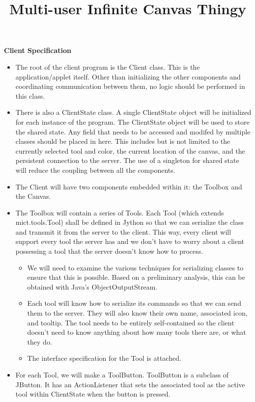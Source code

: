 \documentclass[12pt]{article}
\title{Multi-user Infinite Canvas Thingy}
\begin{document}
 \maketitle
 \textbf{Client Specification}
 \begin{itemize}
 \item
    The root of the client program is the Client class. This is the application/applet itself. Other than initializing the other components and coordinating communication between them, no logic should be performed in this class.
 \item
     There is also a ClientState class. A single ClientState object will be initialized for each instance of the program. The ClientState object will be used to store the shared state. Any field that needs to be accessed and modifed by multiple classes should be placed in here. This includes but is not limited to the currently selected tool and color, the current location of the canvas, and the persistent connection to the server. The use of a singleton for shared state will reduce the coupling between all the components.
 \item
 The Client will have two components embedded within it: the Toolbox and the Canvas.
 \item
  The Toolbox will contain a series of Tools. Each Tool (which extends mict.tools.Tool) shall be defined in Jython so that we can serialize the class and transmit it from the server to the client. This way, every client will support every tool the server has and we don't have to worry about a client possessing a tool that the server doesn't know how to process.
  \begin{itemize}
  \item
  We will need to examine the various techniques for serializing classes to ensure that this is possible. Based on a preliminary analysis, this can be obtained with Java’s ObjectOutputStream.
  \item
  Each tool will know how to serialize its commands so that we can send them to the server. They will also know their own name, associated icon, and tooltip. The tool needs to be entirely self-contained so the client doesn't need to know anything about how many tools there are, or what they do.
  \item
  The interface specification for the Tool is attached.
  \end{itemize}
  \item
  For each Tool, we will make a ToolButton. ToolButton is a subclass of JButton. It has an ActionListener that sets the associated tool as the active tool within ClientState when the button is pressed.

\end{itemize}
\end{document}
